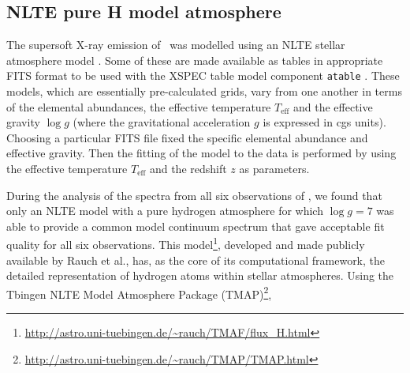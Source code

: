     \subsection{NLTE pure H model atmosphere}
    The supersoft X-ray emission of \source\ was modelled using an NLTE stellar atmosphere model \cite{werner1999classical}. Some of these are made available as tables in appropriate FITS format to be used with the XSPEC table model component \texttt{atable} \cite{rauch2003grid,rauch2010nlte}. These models, which are essentially pre-calculated grids, vary from one another in terms of the elemental abundances, the effective temperature $T_\text{eff}$ and the effective gravity $\log{g}$ (where the gravitational acceleration $g$ is expressed in cgs units). Choosing a particular FITS file fixed the specific elemental abundance and effective gravity. Then the fitting of the model to the data is performed by using the effective temperature $T_\text{eff}$ and the redshift $z$ as parameters.
    
    During the analysis of the spectra from all six observations of \source, we found that only an NLTE model with a pure hydrogen atmosphere for which $\log{g}=7$ was able to provide a common model continuum spectrum that gave acceptable fit quality for all six observations. This model\footnote{\url{http://astro.uni-tuebingen.de/~rauch/TMAF/flux_H.html}}, developed and made publicly available by Rauch et al., has, as the core of its computational framework, the detailed representation of hydrogen atoms within stellar atmospheres. Using the Tbingen NLTE Model Atmosphere Package (TMAP)\footnote{\url{http://astro.uni-tuebingen.de/~rauch/TMAP/TMAP.html}},
    
